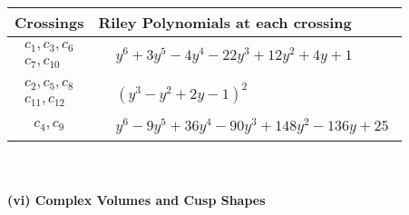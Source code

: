 \documentclass[1p]{elsarticle_modified}
\theoremstyle{definition}
\begin{document}
\begin{tabular}{m{50pt}|m{274pt}}
Crossings & \hspace{64pt}Riley Polynomials at each crossing \\
\hline $$\begin{aligned}c_{1},c_{3},c_{6}\\c_{7},c_{10}\end{aligned}$$&$\begin{aligned}
&y^6+3 y^5-4 y^4-22 y^3+12 y^2+4 y+1
\end{aligned}$\\
\hline $$\begin{aligned}c_{2},c_{5},c_{8}\\c_{11},c_{12}\end{aligned}$$&$\begin{aligned}
&(y^3- y^2+2 y-1)^2
\end{aligned}$\\
\hline $$\begin{aligned}c_{4},c_{9}\end{aligned}$$&$\begin{aligned}
&y^6-9 y^5+36 y^4-90 y^3+148 y^2-136 y+25
\end{aligned}$\\
\hline
\end{tabular}\\~\\
\newpage\flushleft \textbf{(vi) Complex Volumes and Cusp Shapes}
\end{document}
